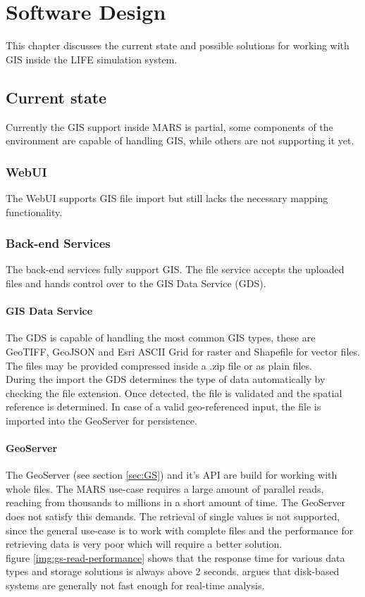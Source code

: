 
\chapter{Software Design}
\label{sec:software_design}
This chapter discusses the current state and possible solutions for working with GIS inside the LIFE simulation system.



\section{Current state}
Currently the GIS support inside MARS is partial, some components of the environment are capable of handling GIS, while others are not supporting it yet.


\subsection{WebUI}
The WebUI supports GIS file import but still lacks the necessary mapping functionality.


\subsection{Back-end Services}
The back-end services fully support GIS. The file service accepts the uploaded files and hands control over to the GIS Data Service (GDS). 

\subsubsection{GIS Data Service}
The GDS is capable of handling the most common GIS types, these are GeoTIFF, GeoJSON and Esri ASCII Grid for raster and Shapefile for vector files. The files may be provided compressed inside a .zip file or as plain files.\\
During the import the GDS determines the type of data automatically by checking the file extension. Once detected, the file is validated and the spatial reference is determined. In case of a valid geo-referenced input, the file is imported into the GeoServer for persistence.

\subsubsection{GeoServer}
The GeoServer (see section \ref{sec:GS}) and it's API are build for working with whole files. The MARS use-case requires a large amount of parallel reads, reaching from thousands to millions in a short amount of time. The GeoServer does not satisfy this demands. The retrieval of single values is not supported, since the general use-case is to work with complete files and the performance for retrieving data is very poor which will require a better solution.\\
figure \ref{img:gs-read-performance} shows that the response time for various data types and storage solutions is always above 2 seconds. \cite{Pandey2016} argues that disk-based systems are generally not fast enough for real-time analysis.


